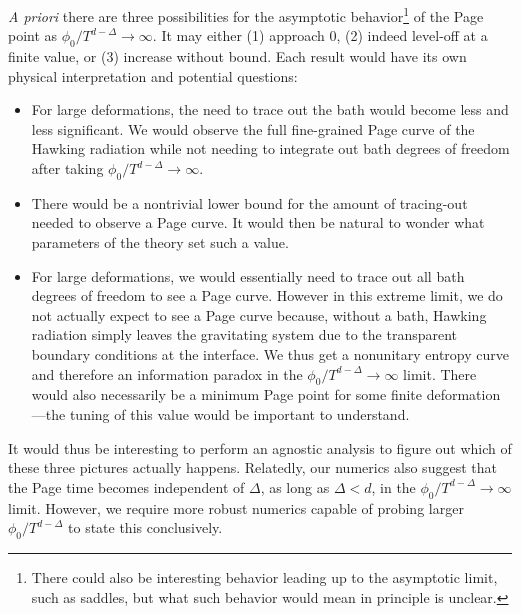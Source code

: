 \documentclass[12pt,a4paper]{article}
\begin{document}
\textit{A priori} there are three possibilities for the asymptotic behavior\footnote{There could also be interesting behavior leading up to the asymptotic limit, such as saddles, but what such behavior would mean in principle is unclear.} of the Page point as $\phi_0/T^{d-\Delta} \to \infty$. It may either (1) approach $0$, (2) indeed level-off at a finite value, or (3) increase without bound. Each result would have its own physical interpretation and potential questions:
\begin{itemize}
\item[(1)] For large deformations, the need to trace out the bath would become less and less significant. We would observe the full fine-grained Page curve of the Hawking radiation while not needing to integrate out bath degrees of freedom after taking $\phi_0/T^{d-\Delta} \to \infty$.%

\item[(2)] There would be a nontrivial lower bound for the amount of tracing-out needed to observe a Page curve. It would then be natural to wonder what parameters of the theory set such a value.

\item[(3)] For large deformations, we would essentially need to trace out all bath degrees of freedom to see a Page curve. However in this extreme limit, we do not actually expect to see a Page curve because, without a bath, Hawking radiation simply leaves the gravitating system due to the transparent boundary conditions at the interface. We thus get a nonunitary entropy curve and therefore an information paradox in the $\phi_0/T^{d-\Delta} \to \infty$ limit. There would also necessarily be a minimum Page point for some finite deformation---the tuning of this value would be important to understand.
\end{itemize}
It would thus be interesting to perform an agnostic analysis to figure out which of these three pictures actually happens. Relatedly, our numerics also suggest that the Page time becomes independent of $\Delta$, as long as $\Delta < d$, in the $\phi_0/T^{d-\Delta} \to \infty$ limit. However, we require more robust numerics capable of probing larger $\phi_0/T^{d-\Delta}$ to state this conclusively.
\end{document}
